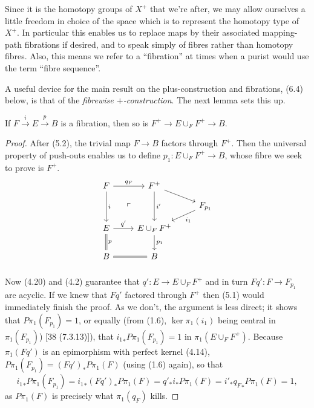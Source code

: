 Since it is the homotopy groups of $X^+$ that we're after, we may allow ourselves a little freedom in choice of the space which is to represent the homotopy type of $X^+$. In particular this enables us to replace maps by their associated mapping-path fibrations if desired, and to speak simply of fibres rather than homotopy fibres. Also, this means we refer to a ``fibration'' at times when a purist would use the term ``fibre sequence''.

A useful device for the main result on the plus-construction and fibrations, (6.4) below, is that of the {\em fibrewise $+$-construction}. The next lemma sets this up.
\begin{lemma}
  If $F\overset{i}{\longrightarrow} E\overset{p}{\longrightarrow} B$ is a fibration, then so is $F^+\longrightarrow E\cup_F F^+ \longrightarrow B$.
\end{lemma}
\begin{proof}
 After (5.2), the trivial map $F \longrightarrow B$ factors through $F^+$. Then the universal property of push-outs enables us to define $p_1\colon   E\cup_F F^+ \rightarrow B$, whose fibre we seek to prove is $F^+$.
 \[
\begin{tikzcd}[row sep=small]
 F \arrow{r}{q_F} \arrow{dd}{i} \arrow[ddr, phantom, "\ulcorner"] & F^+ \arrow{dd}{i'} \arrow{rd} & \\
 & & F_{p_1} \arrow{dl}{i_1}\\
 E \arrow{r}{q'} \arrow[equal]{dd}{p} & E\cup_F F^+ \arrow{dd}{p_1} & \\
 &  & \\
 B \arrow[equal]{r} & B &\\
 \end{tikzcd}
 \]
Now (4.20) and (4.2) guarantee that $q'\colon   E \longrightarrow E\cup_F F^+$ and in turn $Fq'\colon   F\longrightarrow F_{p_1} $ are acyclic. If we knew that $Fq'$ factored through $F^+$ then (5.1) would immediately finish the proof. As we don't, the argument is less direct; it shows that $P\pi_1(F_{p_1}) = 1$, or equally (from (1.6), $\ker \pi_1(i_1)$ being central in $\pi_1(F_{p_1})$) [38 (7.3.13)]), that ${i_1}_*P\pi_1(F_{p_1}) = 1$ in $\pi_1(E\cup_F F^+)$. Because $\pi_1(Fq')$ is an epimorphism with perfect kernel (4.14), $P\pi_1(F_{p_1})=(Fq')_*P\pi_1(F)$ (using (1.6) again), so that
\[{i_1}_*P\pi_1(F_{p_1}) ={i_1}_*(Fq')_*P\pi_1(F)=q'_*i_*P\pi_1(F)=i'_*{q_{F}}_*P\pi_1(F)=1,\]
as $P\pi_1(F)$ is precisely what $\pi_1(q_F)$ kills.
 \end{proof}
  
